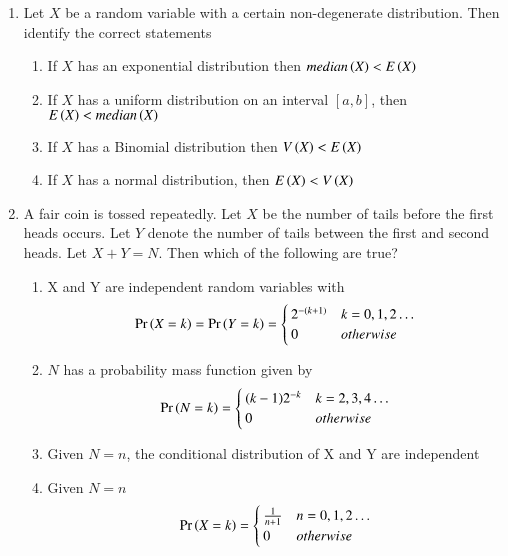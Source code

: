\begin{enumerate}[label=\thesection.\arabic*.,ref=\thesection.\theenumi]
\item Let $X$ be a random variable with a certain non-degenerate distribution. Then identify the correct statements
\begin{enumerate}
    \item If $X$ has an exponential distribution then $median\left(X\right)<E\left(X\right)$
    \item If $X$ has a uniform distribution on an interval $[a,b]$, then $E\left(X\right)<median\left(X\right)$
    \item If $X$ has a Binomial distribution then $V\left(X\right)<E\left(X\right)$
    \item If $X$ has a normal distribution, then $E\left(X\right)<V\left(X\right)$
\end{enumerate}
%
\solution

%
\item A fair coin is tossed repeatedly. Let $X$ be the number of tails before the first heads occurs. Let $Y$ denote the number of tails between the first and second heads. Let $X+Y = N$. Then which of the following are true?
\begin{enumerate}
    \item X and Y are independent random variables with
    {\footnotesize
    \begin{align}
        \Pr\left(X = k\right) = \Pr\left(Y = k\right) =
        \begin{cases}
            2^{-(k+1)} & k=0,1,2 \ldots
            \\
            0 & otherwise
        \end{cases}
    \end{align}
    }
    \item $N$ has a probability mass function given by
    {\small
     \begin{align}
        \Pr\left(N = k\right) =
        \begin{cases}
            (k-1)2^{-k} & k=2,3,4 \ldots
            \\
            0 & otherwise
        \end{cases}
    \end{align}
    }
    \item Given $N = n$, the conditional distribution of X and Y are independent
    \item Given $N = n$
     \begin{align}
        \Pr\left(X = k\right) =
        \begin{cases}
            \frac{1}{n+1} & n=0,1,2 \ldots
            \\
            0 & otherwise
        \end{cases}
    \end{align}
\end{enumerate}
%


\end{enumerate}
